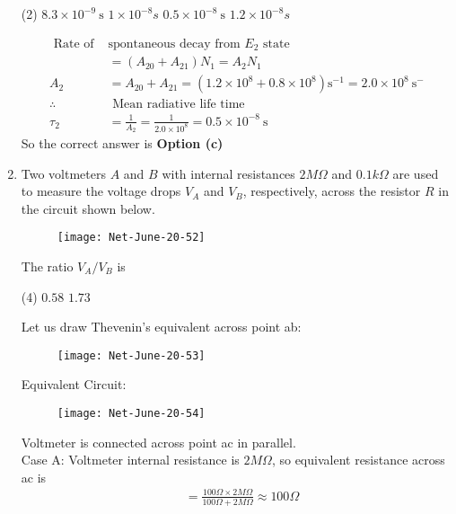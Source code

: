 \begin{enumerate}
 \begin{tasks}(2)
	\task[\textbf{a.}] $8.3 \times 10^{-9} \mathrm{~s}$
	\task[\textbf{b.}]$1 \times 10^{-8} s$
	\task[\textbf{c.}]$0.5 \times 10^{-8} \mathrm{~s}$
	\task[\textbf{d.}]$1.2 \times 10^{-8} s$ 
\end{tasks}
\begin{answer}
	\begin{align*}
	\text { Rate of }&\text{spontaneous decay from } E_{2} \text { state }\\
	&=\left(A_{20}+A_{21}\right) N_{1}=A_{2} N_{1} \\
	A_{2}&=A_{20}+A_{21}=\left(1.2 \times 10^{8}+0.8 \times 10^{8}\right) \mathrm{s}^{-1}=2.0 \times 10^{8} \mathrm{~s}^{-}\\
	\therefore &\text{ Mean radiative life time }\\
	\tau_{2}&=\frac{1}{A_{2}}=\frac{1}{2.0 \times 10^{8}}=0.5 \times 10^{-8} \mathrm{~s}
	\end{align*}
		So the correct answer is \textbf{Option (c)}
\end{answer}
\item  Two voltmeters $A$ and $B$ with internal resistances $2 M \Omega$ and $0.1 k \Omega$ are used to measure the voltage drops $V_{A}$ and $V_{B}$, respectively, across the resistor $R$ in the circuit shown below.
\begin{figure}[H]
	\centering
	\texttt{[image: Net-June-20-52]}
\end{figure}
The ratio $V_{A} / V_{B}$ is
 \begin{tasks}(4)
	\task[\textbf{a.}]$0.58$
	\task[\textbf{b.}] $1.73$
\end{tasks}
\begin{answer}
	Let us draw Thevenin's equivalent across point ab:
	\begin{figure}[H]
		\centering
		\texttt{[image: Net-June-20-53]}
	\end{figure}
Equivalent Circuit:
\begin{figure}[H]
	\centering
	\texttt{[image: Net-June-20-54]}
\end{figure}
Voltmeter is connected across point ac in parallel.\\
Case A: Voltmeter internal resistance is $2 M \Omega$, so equivalent resistance across ac is
	\begin{align*}
	&=\frac{100 \Omega \times 2 M \Omega}{100 \Omega+2 M \Omega} \approx 100 \Omega \\

\end{align*}
\end{answer}
\end{enumerate}
